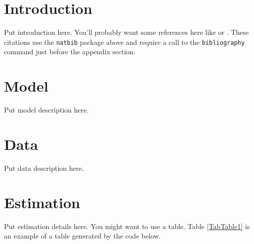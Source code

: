 \documentclass[letterpaper,12pt]{article}
\theoremstyle{definition}
\begin{document}
\begin{spacing}{1.5}{}

\section{Introduction}\label{SecIntro}

  Put introduction here. You'll probably want some references here like \citet{Auerbach:1996} or \citet{DEPR2015}. These citations use the \texttt{natbib} package above and require a call to the \texttt{bibliography} command just before the appendix section.


\section{Model}\label{SecModel}

  Put model description here.


\section{Data}\label{SecData}

  Put data description here.


\section{Estimation}\label{SecEstimation}

  Put estimation details here. You might want to use a table. Table \ref{TabTable1} is an example of a table generated by the code below.


\end{spacing}
\end{document}
